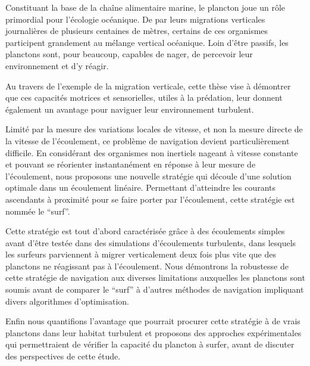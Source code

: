 
\begin{resumes}
Constituant la base de la chaîne alimentaire marine, le plancton joue un rôle primordial pour l’écologie océanique. De par leurs migrations verticales journalières de plusieurs centaines de mètres, certains de ces organismes participent grandement au mélange vertical océanique.
Loin d’être passifs, les planctons sont, pour beaucoup, capables de nager, de percevoir leur environnement et d’y réagir.

Au travers de l'exemple de la migration verticale, cette thèse vise à démontrer que ces capacités motrices et sensorielles, utiles à la prédation, leur donnent également un avantage pour naviguer leur environnement turbulent.

Limité par la mesure des variations locales de vitesse, et non la mesure directe de la vitesse de l'écoulement, ce problème de navigation devient particulièrement difficile. 
En considérant des organismes non inertiels nageant à vitesse constante et pouvant se réorienter instantanément en réponse à leur mesure de l'écoulement, nous proposons une nouvelle stratégie qui découle d'une solution optimale dans un écoulement linéaire. 
Permettant d'atteindre les courants ascendants à proximité pour se faire porter par l'écoulement, cette stratégie est nommée le ``surf''.

Cette stratégie est tout d'abord caractérisée grâce à des écoulements simples avant d'être testée dans des simulations d'écoulements turbulents, dans lesquels les surfeurs parviennent à migrer verticalement deux fois plus vite que des planctons ne réagissant pas à l'écoulement.
Nous démontrons la robustesse de cette stratégie de navigation aux diverses limitations auxquelles les planctons sont soumis avant de comparer  le ``surf'' à d'autres méthodes de navigation impliquant divers algorithmes d'optimisation.

Enfin nous quantifions l'avantage que pourrait procurer cette stratégie à de vrais planctons dans leur habitat turbulent et proposons des approches expérimentales qui permettraient de vérifier la capacité du plancton à surfer, avant de discuter des perspectives de cette étude.
\end{resumes}
